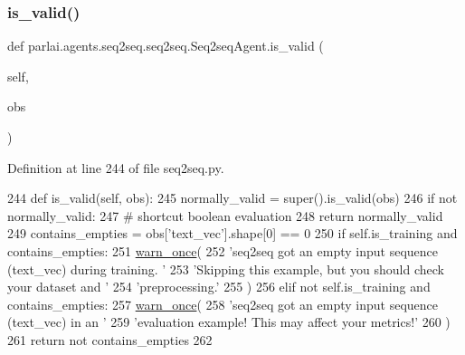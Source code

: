 \mbox{\label{classparlai_1_1agents_1_1seq2seq_1_1seq2seq_1_1Seq2seqAgent_a6fbfdde4ec69ec4050fa4005c6608f1a}} 
\subsubsection{\texorpdfstring{is\+\_\+valid()}{is\_valid()}}
{\footnotesize\ttfamily def parlai.\+agents.\+seq2seq.\+seq2seq.\+Seq2seq\+Agent.\+is\+\_\+valid (\begin{DoxyParamCaption}\item[{}]{self,  }\item[{}]{obs }\end{DoxyParamCaption})}



Definition at line 244 of file seq2seq.\+py.


\begin{DoxyCode}
244     \textcolor{keyword}{def }is\_valid(self, obs):
245         normally\_valid = super().is\_valid(obs)
246         \textcolor{keywordflow}{if} \textcolor{keywordflow}{not} normally\_valid:
247             \textcolor{comment}{# shortcut boolean evaluation}
248             \textcolor{keywordflow}{return} normally\_valid
249         contains\_empties = obs[\textcolor{stringliteral}{'text\_vec'}].shape[0] == 0
250         \textcolor{keywordflow}{if} self.is\_training \textcolor{keywordflow}{and} contains\_empties:
251             \hyperlink{namespaceparlai_1_1utils_1_1misc_acf146e70ea7f6867969a7c2b545d4b4b}{warn\_once}(
252                 \textcolor{stringliteral}{'seq2seq got an empty input sequence (text\_vec) during training. '}
253                 \textcolor{stringliteral}{'Skipping this example, but you should check your dataset and '}
254                 \textcolor{stringliteral}{'preprocessing.'}
255             )
256         \textcolor{keywordflow}{elif} \textcolor{keywordflow}{not} self.is\_training \textcolor{keywordflow}{and} contains\_empties:
257             \hyperlink{namespaceparlai_1_1utils_1_1misc_acf146e70ea7f6867969a7c2b545d4b4b}{warn\_once}(
258                 \textcolor{stringliteral}{'seq2seq got an empty input sequence (text\_vec) in an '}
259                 \textcolor{stringliteral}{'evaluation example! This may affect your metrics!'}
260             )
261         \textcolor{keywordflow}{return} \textcolor{keywordflow}{not} contains\_empties
262 \end{DoxyCode}
\mbox{\label{classparlai_1_1agents_1_1seq2seq_1_1seq2seq_1_1Seq2seqAgent_a6f94b2896a2a76476f8646ec7d9360ed}} 
